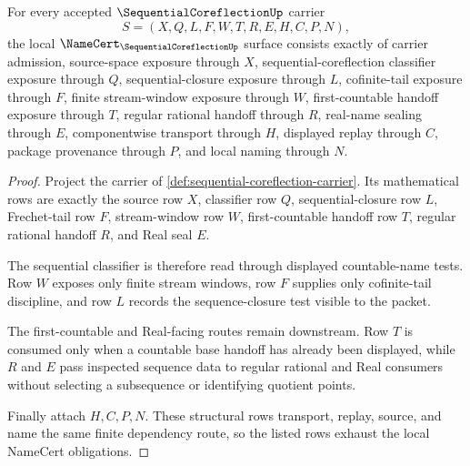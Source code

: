 \begin{theorem}
\label{thm:sequential-coreflection-namecert-obligations}
For every accepted $\SequentialCoreflectionUp$ carrier
$$
S=(X,Q,L,F,W,T,R,E,H,C,P,N),
$$
the local $\NameCert_{\SequentialCoreflectionUp}$ surface consists exactly of carrier admission, source-space exposure through $X$, sequential-coreflection classifier exposure through $Q$, sequential-closure exposure through $L$, cofinite-tail exposure through $F$, finite stream-window exposure through $W$, first-countable handoff exposure through $T$, regular rational handoff through $R$, real-name sealing through $E$, componentwise transport through $H$, displayed replay through $C$, package provenance through $P$, and local naming through $N$.
\end{theorem}
\begin{proof}
Project the carrier of \autoref{def:sequential-coreflection-carrier}. Its mathematical rows are exactly the source row $X$, classifier row $Q$, sequential-closure row $L$, Frechet-tail row $F$, stream-window row $W$, first-countable handoff row $T$, regular rational handoff $R$, and Real seal $E$.

The sequential classifier is therefore read through displayed countable-name tests. Row $W$ exposes only finite stream windows, row $F$ supplies only cofinite-tail discipline, and row $L$ records the sequence-closure test visible to the packet.

The first-countable and Real-facing routes remain downstream. Row $T$ is consumed only when a countable base handoff has already been displayed, while $R$ and $E$ pass inspected sequence data to regular rational and Real consumers without selecting a subsequence or identifying quotient points.

Finally attach $H,C,P,N$. These structural rows transport, replay, source, and name the same finite dependency route, so the listed rows exhaust the local NameCert obligations.
\end{proof}


